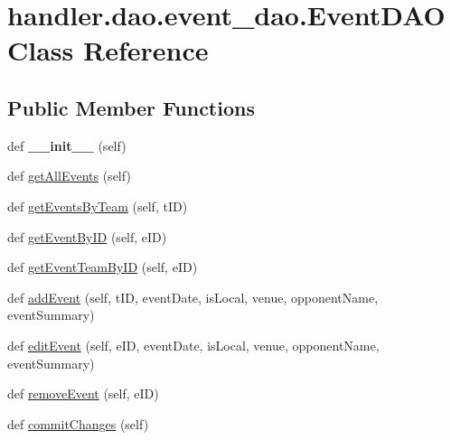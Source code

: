 \hypertarget{classhandler_1_1dao_1_1event__dao_1_1_event_d_a_o}{}\section{handler.\+dao.\+event\+\_\+dao.\+Event\+D\+AO Class Reference}
\label{classhandler_1_1dao_1_1event__dao_1_1_event_d_a_o}
\subsection*{Public Member Functions}
\begin{DoxyCompactItemize}
\item 
\mbox{\label{classhandler_1_1dao_1_1event__dao_1_1_event_d_a_o_a1c67394af1f87e5ac8eea5cfbdc18652}} 
def {\bfseries \+\_\+\+\_\+init\+\_\+\+\_\+} (self)
\item 
def \hyperlink{classhandler_1_1dao_1_1event__dao_1_1_event_d_a_o_aea3ae629c4b67d1a36f88a8faa633b64}{get\+All\+Events} (self)
\item 
def \hyperlink{classhandler_1_1dao_1_1event__dao_1_1_event_d_a_o_a9a546a3f9f5a5fff3bece5d2f7bc4ec1}{get\+Events\+By\+Team} (self, t\+ID)
\item 
def \hyperlink{classhandler_1_1dao_1_1event__dao_1_1_event_d_a_o_a2d55d30055e25d450c1f2833143e4f39}{get\+Event\+By\+ID} (self, e\+ID)
\item 
def \hyperlink{classhandler_1_1dao_1_1event__dao_1_1_event_d_a_o_a1f9f80d3b5442b3732c5cf63049cdd8c}{get\+Event\+Team\+By\+ID} (self, e\+ID)
\item 
def \hyperlink{classhandler_1_1dao_1_1event__dao_1_1_event_d_a_o_a05ea963dea054f4258b89b6bcbf87945}{add\+Event} (self, t\+ID, event\+Date, is\+Local, venue, opponent\+Name, event\+Summary)
\item 
def \hyperlink{classhandler_1_1dao_1_1event__dao_1_1_event_d_a_o_af2b2e609a3c1ba67cbe472852bb46c60}{edit\+Event} (self, e\+ID, event\+Date, is\+Local, venue, opponent\+Name, event\+Summary)
\item 
def \hyperlink{classhandler_1_1dao_1_1event__dao_1_1_event_d_a_o_a3d8c4ff8a724203eeacb90e6cb84450e}{remove\+Event} (self, e\+ID)
\item 
def \hyperlink{classhandler_1_1dao_1_1event__dao_1_1_event_d_a_o_ae7236c64bac6acc44feb3bc486a2c2a4}{commit\+Changes} (self)
\end{DoxyCompactItemize}
